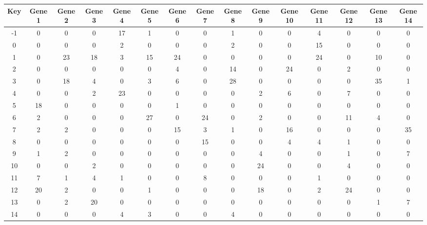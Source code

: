 \begin{tabular}{|c|c|c|c|c|c|c|c|c|c|c|c|c|c|c|}
\hline
Key & Gene 1 & Gene 2 & Gene 3 & Gene 4 & Gene 5 & Gene 6 & Gene 7 & Gene 8 & Gene 9 & Gene 10 & Gene 11 & Gene 12 & Gene 13 & Gene 14 \\
\hline
-1 & 0 & 0 & 0 & 17 & 1 & 0 & 0 & 1 & 0 & 0 & 4 & 0 & 0 & 0 \\
0 & 0 & 0 & 0 & 2 & 0 & 0 & 0 & 2 & 0 & 0 & 15 & 0 & 0 & 0 \\
1 & 0 & 23 & 18 & 3 & 15 & 24 & 0 & 0 & 0 & 0 & 24 & 0 & 10 & 0 \\
2 & 0 & 0 & 0 & 0 & 0 & 4 & 0 & 14 & 0 & 24 & 0 & 2 & 0 & 0 \\
3 & 0 & 18 & 4 & 0 & 3 & 6 & 0 & 28 & 0 & 0 & 0 & 0 & 35 & 1 \\
4 & 0 & 0 & 2 & 23 & 0 & 0 & 0 & 0 & 2 & 6 & 0 & 7 & 0 & 0 \\
5 & 18 & 0 & 0 & 0 & 0 & 1 & 0 & 0 & 0 & 0 & 0 & 0 & 0 & 0 \\
6 & 2 & 0 & 0 & 0 & 27 & 0 & 24 & 0 & 2 & 0 & 0 & 11 & 4 & 0 \\
7 & 2 & 2 & 0 & 0 & 0 & 15 & 3 & 1 & 0 & 16 & 0 & 0 & 0 & 35 \\
8 & 0 & 0 & 0 & 0 & 0 & 0 & 15 & 0 & 0 & 4 & 4 & 1 & 0 & 0 \\
9 & 1 & 2 & 0 & 0 & 0 & 0 & 0 & 0 & 4 & 0 & 0 & 1 & 0 & 7 \\
10 & 0 & 0 & 2 & 0 & 0 & 0 & 0 & 0 & 24 & 0 & 0 & 4 & 0 & 0 \\
11 & 7 & 1 & 4 & 1 & 0 & 0 & 8 & 0 & 0 & 0 & 1 & 0 & 0 & 0 \\
12 & 20 & 2 & 0 & 0 & 1 & 0 & 0 & 0 & 18 & 0 & 2 & 24 & 0 & 0 \\
13 & 0 & 2 & 20 & 0 & 0 & 0 & 0 & 0 & 0 & 0 & 0 & 0 & 1 & 7 \\
14 & 0 & 0 & 0 & 4 & 3 & 0 & 0 & 4 & 0 & 0 & 0 & 0 & 0 & 0 \\
\hline
\end{tabular}